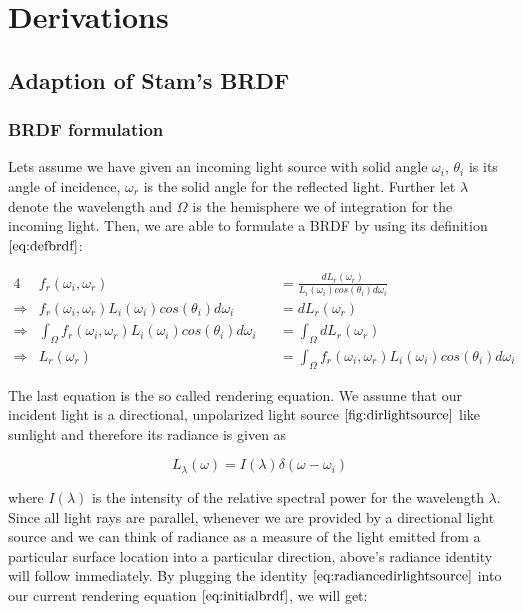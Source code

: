 \chapter{Derivations}
\section{Adaption of Stam's BRDF}
\subsection{BRDF formulation}
Lets assume we have given an incoming light source with solid angle $\omega_i$, $\theta_i$ is its angle of incidence, $\omega_r$ is the solid angle for the reflected light. Further let $\lambda$ denote the wavelength and $\Omega$ is the hemisphere we of integration for the incoming light. Then, we are able to formulate a BRDF by using its definition $\ref{eq:defbrdf}$:  

\begin{alignat}{4}
& f_r(\omega_i, \omega_r) &&= \frac{dL_r(\omega_r)}{L_i(\omega_i)cos(\theta_i)d\omega_i} \nonumber \\
\Rightarrow{} & f_r(\omega_i, \omega_r) L_i(\omega_i)cos(\theta_i)d\omega_i &&= dL_r(\omega_r) \nonumber \\
\Rightarrow{} & \int_{\Omega}f_r(\omega_i, \omega_r) L_i(\omega_i)cos(\theta_i)d\omega_i &&= \int_{\Omega}dL_r(\omega_r) \nonumber\\
\Rightarrow{} & L_r(\omega_r) &&= \int_{\Omega}f_r(\omega_i, \omega_r) L_i(\omega_i)cos(\theta_i)d\omega_i
\label{eq:initialbrdf}
\end{alignat}

The last equation is the so called rendering equation.$\label{sec:dirlighsourceassumption}$ We assume that our incident light is a directional, unpolarized light source $\ref{fig:dirlightsource}$ like sunlight and therefore its radiance is given as 

\begin{equation}
 L_{\lambda}(\omega)=I(\lambda)\delta(\omega-\omega_i)
\label{eq:radiancedirlightsource}
\end{equation}

where $I(\lambda)$ is the intensity of the relative spectral power for the wavelength $\lambda$. 
Since all light rays are parallel, whenever we are provided by a directional light source and we can think of radiance as a measure of the light emitted from a particular surface location into a particular direction, above's radiance identity will follow immediately. By plugging the identity $\ref{eq:radiancedirlightsource}$ into our current rendering equation $\ref{eq:initialbrdf}$, we will get:

